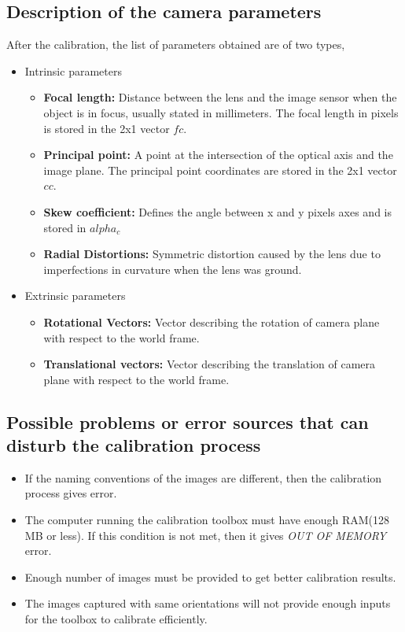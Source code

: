 \documentclass[11pt,a4paper]{article}
\begin{document}
	
	\subsection{Description of the camera parameters}
	After the calibration, the list of parameters obtained are of two types,
	\begin{itemize}
		\item Intrinsic parameters
		\begin{itemize}
			\item \textbf{Focal length:} Distance between the lens and the image sensor when the object is in focus, usually stated in millimeters. The focal length in pixels is stored in the 2x1 vector $fc$. 
			\item \textbf{Principal point:} A point at the intersection of the optical axis and the image plane. The principal point coordinates are stored in the 2x1 vector $cc$.
			\item \textbf{Skew coefficient:} Defines the angle between x and y pixels axes and is stored in $alpha_c$
			\item \textbf{Radial Distortions:} Symmetric distortion caused by the lens due to imperfections in curvature when the lens was ground.
		\end{itemize}
		\item Extrinsic parameters
		\begin{itemize}
			\item \textbf{Rotational Vectors:} Vector describing the rotation of camera plane with respect to the world frame.
			\item \textbf{Translational vectors:} Vector describing the translation of camera plane with respect to the world frame.
		\end{itemize}
	\end{itemize}
	
	\subsection{Possible problems or error sources that can disturb the calibration process}
	\begin{itemize}
		\item If the naming conventions of the images are different, then the calibration process gives error.
		\item The computer running the calibration toolbox must have enough RAM(128 MB or less). If this condition is not met, then it gives \textit{OUT OF MEMORY} error.
		\item Enough number of images must be provided to get better calibration results.
		\item The images captured with same orientations will not provide enough inputs for the toolbox to calibrate efficiently.
	\end{itemize}
	
\end{document}
